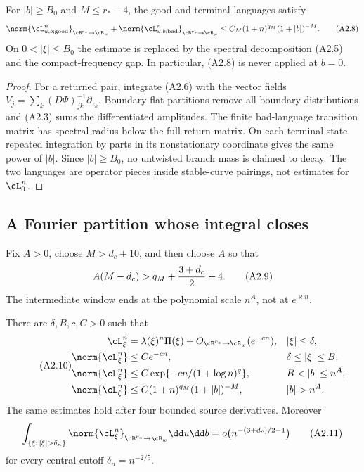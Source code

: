 \begin{lemma}
\label{lem:r31-a2-twisted}
For $|b|\ge B_0$ and $M\le r_*-4$, the good and terminal languages satisfy
\[
 \norm{\cL_{u,b;\mathrm{good}}^n}_{\cB^{r_*}\to\cB_w}
 +\norm{\cL_{u,b;\mathrm{bad}}^n}_{\cB^{r_*}\to\cB_w}
 \le C_M(1+n)^{q_M}(1+|b|)^{-M}.                         \tag{A2.8}
\]
On $0<|\xi|\le B_0$ the estimate is replaced by the spectral decomposition
(A2.5) and the compact-frequency gap.  In particular, (A2.8) is never applied
at $b=0$.
\end{lemma}

\begin{proof}
For a returned pair, integrate (A2.6) with the vector fields
$V_j=\sum_k(D\Psi)^{-1}_{jk}\partial_{z_k}$.  Boundary-flat partitions remove
all boundary distributions and (A2.3) sums the differentiated amplitudes.
The finite bad-language transition matrix has spectral radius below the full
return matrix.  On each terminal state repeated integration by parts in its
nonstationary coordinate gives the same power of $|b|$.  Since $|b|\ge B_0$,
no untwisted branch mass is claimed to decay.  The two languages are operator
pieces inside stable-curve pairings, not estimates for $\cL_0^n$.
\end{proof}

\subsection{A Fourier partition whose integral closes}

Fix $A>0$, choose $M>d_c+10$, and then choose $A$ so that
\[
 A(M-d_c)>q_M+{3+d_c\over2}+4.                            \tag{A2.9}
\]
The intermediate window ends at the polynomial scale $n^A$, not at
$e^{\varkappa n}$.

\begin{theorem}
\label{thm:r31-a2-fourier}
There are $\delta,B,c,C>0$ such that
\begin{equation}\tag{A2.10}
\begin{aligned}
 \cL_\xi^n
 &=\lambda(\xi)^n\Pi(\xi)+O_{\cB^{r_*}\to\cB_w}(e^{-cn}),
 &&|\xi|\le\delta,\\
 \norm{\cL_\xi^n}&\le Ce^{-cn},
 &&\delta\le|\xi|\le B,\\
 \norm{\cL_\xi^n}&\le
 C\exp\{-cn/(1+\log n)^q\},
 &&B<|b|\le n^A,\\
 \norm{\cL_\xi^n}&\le C(1+n)^{q_M}(1+|b|)^{-M},
 &&|b|>n^A.
\end{aligned}
\end{equation}
The same estimates hold after four bounded source derivatives.  Moreover
\[
 \int_{\{\xi:\,|\xi|>\delta_n\}}
 \norm{\cL_\xi^n}_{\cB^{r_*}\to\cB_w}\dd u\dd b
 =o\bigl(n^{-(3+d_c)/2-1}\bigr)                           \tag{A2.11}
\]
for every central cutoff $\delta_n=n^{-2/5}$.
\end{theorem}

